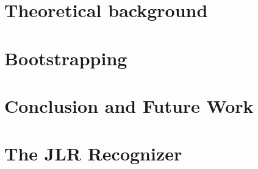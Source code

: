 \documentclass[nonatbib,preprint,numbers]{sigplanconf}
\begin{document}
\section{Theoretical background}
\label{Section:theoretical-background}


\section{Bootstrapping \Fajita}
\label{Section:bootstrapping}


\section{Conclusion and Future Work}
\label{Section:zz}



\small


\clearpage
\appendix
\section{The JLR Recognizer}

\end{document}
